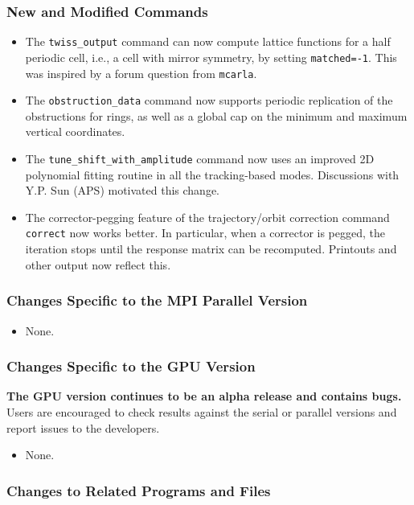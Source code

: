 \documentclass[11pt]{article}
\begin{document}
\subsubsection{New and Modified Commands}
\begin{itemize}
\item The \verb|twiss_output| command can now compute lattice functions for a half periodic cell, i.e., a 
  cell with mirror symmetry, by setting \verb|matched=-1|. This was inspired by a forum question from \verb|mcarla|.
\item The \verb|obstruction_data|  command now supports periodic replication of the obstructions for rings, as well
  as a global cap on the minimum and maximum vertical coordinates.
\item The \verb|tune_shift_with_amplitude| command now uses an improved 2D polynomial fitting routine in all the
  tracking-based modes. Discussions with Y.P. Sun (APS) motivated this change.
\item The corrector-pegging feature of the trajectory/orbit correction command \verb|correct| now works better.
  In particular, when a corrector is pegged, the iteration stops until the response matrix can be recomputed.
  Printouts and other output now reflect this.
\end{itemize}

\subsubsection{Changes Specific to the MPI Parallel Version}

\begin{itemize}
\item None.
\end{itemize}

\subsubsection{Changes Specific to the GPU Version}

{\bf The GPU version continues to be an alpha release and contains bugs.}  Users are encouraged to check results against
the serial or parallel versions and report issues to the developers.

\begin{itemize}
\item None.
\end{itemize}

\subsubsection{Changes to Related Programs and Files}
\end{document}
